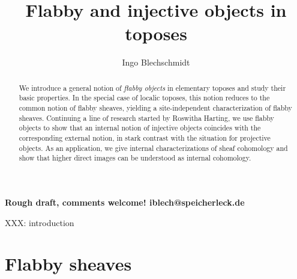 \documentclass[oneside]{amsart}
\title{Flabby and injective objects in toposes}
\author{Ingo Blechschmidt}
\theoremstyle{definition}
\theoremstyle{plain}
\theoremstyle{remark}
\renewcommand{\_}{\mathpunct{.}\,}
\begin{document}
\begin{abstract}
  We introduce a general notion of \emph{flabby objects} in elementary toposes
  and study their basic properties. In the special case of localic toposes, this
  notion reduces to the common notion of flabby sheaves, yielding a
  site-independent characterization of flabby sheaves. Continuing a line of
  research started by Roswitha Harting, we use flabby objects to
  show that an internal notion of injective objects coincides with the
  corresponding external notion, in stark contrast with the situation for
  projective objects. As an application, we give internal characterizations of
  sheaf cohomology and show that higher direct images can be understood as
  internal cohomology.
\end{abstract}

\maketitle
\thispagestyle{empty}

{\centering \textbf{Rough draft, comments welcome! iblech@speicherleck.de}\par}
\bigskip

\noindent

XXX: introduction

\section{Flabby sheaves}
\end{document}
